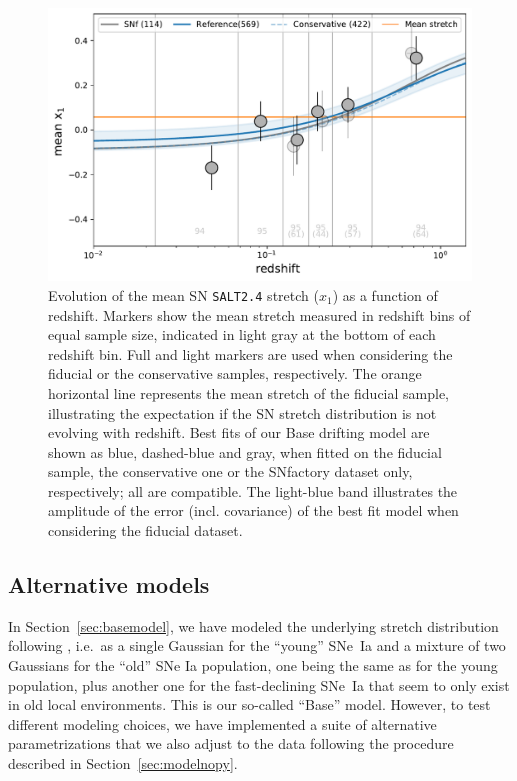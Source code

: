 \documentclass[]{aa}
\begin{document}
\begin{figure}
    \centering
    \includegraphics[width=0.7\linewidth]{Article_figures/stretchevol_all_vs_snf.pdf}
    \caption{Evolution of the mean SN \textsc{\texttt{SALT2.4}} stretch ($x_1$)
        as a function of redshift. Markers show the mean stretch measured in
        redshift bins of equal sample size, indicated in light gray at the
        bottom of each redshift bin. Full and light markers are used when
        considering the fiducial or the conservative samples, respectively. The
        orange horizontal line represents the mean stretch of the fiducial
        sample, illustrating the expectation if the SN stretch distribution is
        not evolving with redshift. Best fits of our Base drifting model are
        shown as blue, dashed-blue and gray, when fitted on the fiducial sample,
        the conservative one or the SNfactory dataset only, respectively; all
        are compatible. The light-blue band illustrates the amplitude of the
        error (incl. covariance) of the best fit model when considering the
        fiducial dataset.}
    \label{fig:modelall}
\end{figure}

\subsection{Alternative models}\label{sec:othermodel}

In Section~\ref{sec:basemodel}, we have modeled the underlying stretch
distribution following \cite{rigault2018}, i.e.\ as a single Gaussian for the
``young'' SNe~Ia and a mixture of two Gaussians for the ``old'' SNe Ia
population, one being the same as for the young population, plus another one for
the fast-declining SNe~Ia that seem to only exist in old local environments.
This is our so-called ``Base'' model. However, to test different modeling
choices, we have implemented a suite of alternative parametrizations that we
also adjust to the data following the procedure described in
Section~\ref{sec:modelnopy}. 
\end{document}
